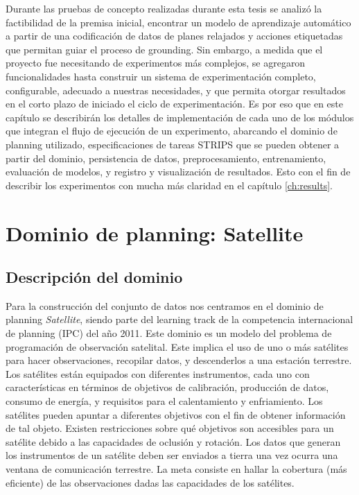 Durante las pruebas de concepto realizadas durante esta tesis se analizó la
factibilidad de la premisa inicial, encontrar un modelo de aprendizaje
automático a partir de una codificación de datos de planes relajados y acciones
etiquetadas que permitan guiar el proceso de grounding. Sin embargo, a medida
que el proyecto fue necesitando de experimentos más complejos, se agregaron
funcionalidades hasta construir un sistema de experimentación completo,
configurable, adecuado a nuestras necesidades, y que permita otorgar resultados
en el corto plazo de iniciado el ciclo de experimentación. Es por eso que en
este capítulo se describirán los detalles de implementación de cada uno de los
módulos que integran el flujo de ejecución de un experimento, abarcando el
dominio de planning utilizado, especificaciones de tareas STRIPS que se pueden
obtener a partir del dominio, persistencia de datos, preprocesamiento,
entrenamiento, evaluación de modelos, y registro y visualización de resultados.
Esto con el fin de describir los experimentos con mucha más claridad en el
capítulo \ref{ch:results}.
\section{Dominio de planning: Satellite}

\subsection{Descripción del dominio}

Para la construcción del conjunto de datos nos centramos en el dominio de
planning \emph{Satellite}, siendo parte del learning track de la competencia
internacional de planning (IPC) del año 2011. Este dominio es un modelo del
problema de programación de observación satelital. Este implica el uso de uno o
más satélites para hacer observaciones, recopilar datos, y descenderlos a una
estación terrestre. Los satélites están equipados con diferentes instrumentos,
cada uno con características en términos de objetivos de calibración, producción
de datos, consumo de energía, y requisitos para el calentamiento y enfriamiento.
Los satélites pueden apuntar a diferentes objetivos con el fin de obtener
información de tal objeto. Existen restricciones sobre qué objetivos son
accesibles para un satélite debido a las capacidades de oclusión y rotación. Los
datos que generan los instrumentos de un satélite deben ser enviados a tierra
una vez ocurra una ventana de comunicación terrestre. La meta consiste en hallar
la cobertura (más eficiente) de las observaciones dadas las capacidades de los
satélites.

